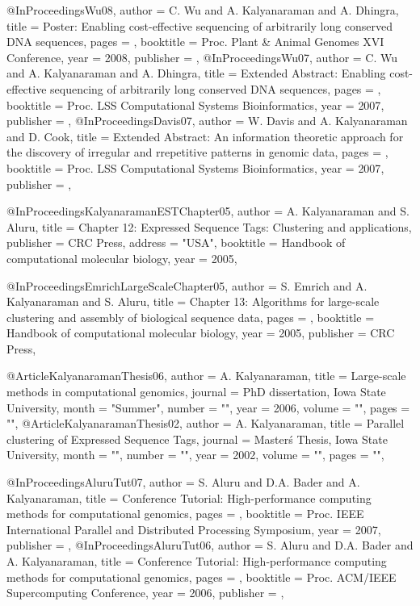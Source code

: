 @InProceedings{Wu08,
  author =       {C. Wu and A. Kalyanaraman and A. Dhingra},
  title =        {{Poster: Enabling cost-effective sequencing of arbitrarily long conserved DNA sequences}},
  pages =        {},
  booktitle =    {Proc. Plant \& Animal Genomes XVI Conference},
  year =         {2008},
  publisher =    {},
}
@InProceedings{Wu07,
  author =       {C. Wu and A. Kalyanaraman and A. Dhingra},
  title =        {{Extended Abstract: Enabling cost-effective sequencing of arbitrarily long conserved DNA sequences}},
  pages =        {},
  booktitle =    {Proc. LSS Computational Systems Bioinformatics},
  year =         {2007},
  publisher =    {},
}
@InProceedings{Davis07,
  author =       {W. Davis and A. Kalyanaraman and D. Cook},
  title =        {Extended Abstract: An information theoretic approach for the discovery of irregular and rrepetitive patterns in genomic data},
  pages =        {},
  booktitle =    {Proc. LSS Computational Systems Bioinformatics},
  year =         {2007},
  publisher =    {},
}




@InProceedings{KalyanaramanESTChapter05,
  author =       {A. Kalyanaraman and S. Aluru},
  title =  {{Chapter 12: Expressed Sequence Tags: Clustering and applications}},
  publisher =    {CRC Press},
  address   =    "USA",
  booktitle =    {Handbook of computational molecular biology},
  year =         {2005},
}

@InProceedings{EmrichLargeScaleChapter05,
  author =       {S. Emrich and A. Kalyanaraman and S. Aluru},
  title =  {{Chapter 13: Algorithms for large-scale clustering and assembly of biological sequence data}},
  pages =        {},
  booktitle =    {Handbook of computational molecular biology},
  year =         {2005},
  publisher =    {CRC Press},
}


@Article{KalyanaramanThesis06,
   author =   {A. Kalyanaraman},
   title =   {Large-scale methods in computational genomics},
   journal =   {PhD dissertation, Iowa State University},
   month = "Summer",
   number = "",
   year =   {2006},
   volume =   "",
   pages =   "",
}
@Article{KalyanaramanThesis02,
   author =   {A. Kalyanaraman},
   title =   {Parallel clustering of Expressed Sequence Tags},
   journal =   {Master\'s Thesis, Iowa State University},
   month = "",
   number = "",
   year =   {2002},
   volume =   "",
   pages =   "",
}


@InProceedings{AluruTut07,
  author =       {S. Aluru and D.A. Bader and A. Kalyanaraman},
  title =  {Conference Tutorial: High-performance computing methods for computational genomics},
  pages =        {},
  booktitle =    {Proc. IEEE International Parallel and Distributed Processing Symposium},
  year =         {2007},
  publisher =    {},
}
@InProceedings{AluruTut06,
  author =       {S. Aluru and D.A. Bader and A. Kalyanaraman},
  title =  {Conference Tutorial: High-performance computing methods for computational genomics},
  pages =        {},
  booktitle =    {Proc. ACM/IEEE Supercomputing Conference},
  year =         {2006},
  publisher =    {},
}


